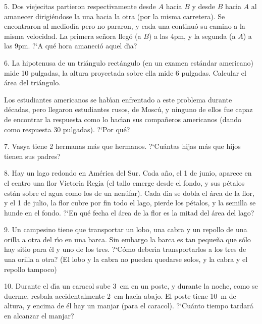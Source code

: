 \begin{problem}{5.}
	Dos viejecitas partieron respectivamente desde $A$ hacia $B$ y desde $B$ hacia $A$ al amanecer dirigi\'endose la
	una hacia la otra (por la misma carretera). Se encontraron al mediod\'{\i}a pero no pararon, y cada una continu\'o su 
	camino a la misma velocidad. La primera se\~nora lleg\'o (a $B$) a las 4pm, y la segunda (a $A$) a las 9pm. ?`A qu\'e hora amaneci\'o aquel d\'{\i}a? 
\end{problem}

\begin{problem}{6.}
	La hipotenusa de un tri\'angulo rect\'angulo (en un examen est\'andar americano) mide 10 pulgadas,
	la altura proyectada sobre ella mide 6 pulgadas. Calcular el \'area del tri\'angulo.

	Los estudiantes americanos se hab\'{\i}an enfrentado a este problema durante d\'ecadas, pero llegaron estudiantes rusos,
	de Mosc\'u, y ninguno de ellos fue capaz de encontrar la respuesta como lo hac\'{\i}an sus compa\~neros americanos 
	(dando como respuesta 30 pulgadas). ?`Por qu\'e?
\end{problem}

\begin{problem}{7.}
	Vasya tiene 2 hermanas m\'as que hermanos. ?`Cu\'antas hijas m\'as que hijos tienen sus padres?
\end{problem}

\begin{problem}{8.}
	Hay un lago redondo en Am\'erica del Sur. Cada a\~no, el 1 de junio, aparece en el centro una flor Victoria Regia
	(el tallo emerge desde el fondo, y sus p\'etalos est\'an sobre el agua como los de un nen\'ufar). Cada d\'{\i}a se dobla
	el \'area de la flor, y el 1 de julio, la flor cubre por fin todo el lago, pierde los p\'etalos, y la semilla se hunde
	en el fondo. ?`En qu\'e fecha el \'area de la flor es la mitad del \'area del lago?
\end{problem}

\begin{problem}{9.}
	Un campesino tiene que transportar un lobo, una cabra y un repollo de una orilla a otra del r\'{\i}o en una barca.
	Sin embargo la barca es tan peque\~na que s\'olo hay sitio para \'el y uno de los tres. ?`C\'omo deber\'{\i}a
	transportarlos a los tres de una orilla a otra? (El lobo y la cabra no pueden quedarse solos, y la cabra y el repollo
	tampoco)
\end{problem}

\begin{problem}{10.}
	Durante el d\'{\i}a un caracol sube \SI{3}{\cm} en un poste, y durante la noche, como se duerme, resbala
	accidentalmente \SI{2}{\cm} hacia abajo. El poste tiene \SI{10}{\metre} de altura, y encima de \'el hay un manjar (para el caracol). 
	?`Cu\'anto tiempo tardar\'a en alcanzar el manjar?
\end{problem}

